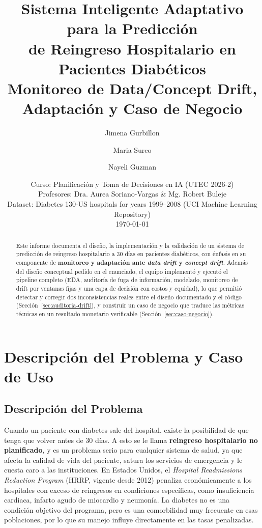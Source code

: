 \documentclass[11pt,a4paper]{article}
\title{\textbf{Sistema Inteligente Adaptativo para la Predicción\\ de Reingreso Hospitalario en Pacientes Diabéticos}\\[0.3em]
\large Monitoreo de Data/Concept Drift, Adaptación y Caso de Negocio}
\author{Jimena Gurbillon \and Maria Surco \and Nayeli Guzman}
\date{Curso: Planificación y Toma de Decisiones en IA (UTEC 2026-2) \\
Profesores: Dra. Aurea Soriano-Vargas \& Mg. Robert Buleje \\
Dataset: Diabetes 130-US hospitals for years 1999--2008 (UCI Machine Learning Repository) \\[0.5em]
\today}
\begin{document}
\maketitle
\thispagestyle{empty}

\begin{abstract}
\noindent Este informe documenta el diseño, la implementación y la validación de un sistema de predicción de reingreso hospitalario a 30 días en pacientes diabéticos, con énfasis en su componente de \textbf{monitoreo y adaptación ante \emph{data drift} y \emph{concept drift}}. Además del diseño conceptual pedido en el enunciado, el equipo implementó y ejecutó el pipeline completo (EDA, auditoría de fuga de información, modelado, monitoreo de drift por ventanas fijas y una capa de decisión con costos y equidad), lo que permitió detectar y corregir dos inconsistencias reales entre el diseño documentado y el código (Sección~\ref{sec:auditoria-drift}), y construir un caso de negocio que traduce las métricas técnicas en un resultado monetario verificable (Sección~\ref{sec:caso-negocio}).
\end{abstract}

\tableofcontents
\newpage

\section{Descripción del Problema y Caso de Uso}

\subsection{Descripción del Problema}

Cuando un paciente con diabetes sale del hospital, existe la posibilidad de que tenga que volver antes de 30 días. A esto se le llama \textbf{reingreso hospitalario no planificado}, y es un problema serio para cualquier sistema de salud, ya que afecta la calidad de vida del paciente, satura los servicios de emergencia y le cuesta caro a las instituciones. En Estados Unidos, el \emph{Hospital Readmissions Reduction Program} (HRRP, vigente desde 2012) penaliza económicamente a los hospitales con exceso de reingresos en condiciones específicas, como insuficiencia cardiaca, infarto agudo de miocardio y neumonía. La diabetes no es una condición objetivo del programa, pero es una comorbilidad muy frecuente en esas poblaciones, por lo que su manejo influye directamente en las tasas penalizadas.
\end{document}
